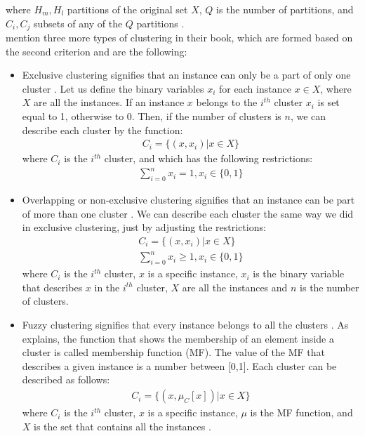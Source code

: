 where \(H_{m}, H_{l}\) partitions of the original set \(X\), \(Q\) is the number of partitions, and \(C_{i}, C_{j}\) subsets of any of the \(Q\) partitions \autocite[646]{survey}. \\
\textcite{tanSteinKum} mention three more types of clustering in their book, which are formed based on the second criterion and are the following: \\
\begin{itemize}
\item Exclusive clustering signifies that an instance can only be a part of only one cluster \autocite[492]{tanSteinKum}. Let us define the binary variables \(x_{i}\) for each instance \(x \in X \), where \(X\) are all the instances. If an instance \(x\) belongs to the \(i^{th}\) cluster \(x_{i}\) is set equal to 1, otherwise to 0. Then, if the number of clusters is \(n\), we can describe each cluster by the function:
\begin{eqnarray*}
C_{i} = \{(x, x_{i})|x \in X\}
\end{eqnarray*}
where \(C_{i}\) is the \(i^{th}\) cluster, and which has the following restrictions:
\begin{eqnarray*}
\sum_{i=0}^{n} x_{i} = 1, x_{i} \in \{0,1\}
\end{eqnarray*}
\item Overlapping or non-exclusive clustering signifies that an instance can be part of more than one cluster \autocite[492]{tanSteinKum}. We can describe each cluster the same way we did in exclusive clustering, just by adjusting the restrictions:
\begin{eqnarray*}
C_{i} = \{(x, x_{i})|x \in X\} \\
\sum_{i=0}^{n} x_{i} \geq 1, x_{i} \in \{0,1\}
\end{eqnarray*}
where \(C_{i}\) is the \(i^{th}\) cluster, \(x\) is a specific instance, \(x_{i}\) is the binary variable that describes \(x\) in the \(i^{th}\) cluster, \(X\) are all the instances and \(n\) is the number of clusters.
\item Fuzzy clustering signifies that every instance belongs to all the clusters \autocite[492]{tanSteinKum}. As \textcite{kantar} explains, the function that shows the membership of an element inside a cluster is called membership function (MF). The value of the MF that describes a given instance is a number between [0,1]. Each cluster can be described as follows:
\begin{eqnarray*}
C_{i} = \{(x, \mu_{C}[x])|x \in X\}
\end{eqnarray*}
where \(C_{i}\) is the \(i^{th}\) cluster, \(x\) is a specific instance, \(\mu\) is the MF function, and \( X\) is the set that contains all the instances \autocite[416]{kantar}.
\end{itemize}


